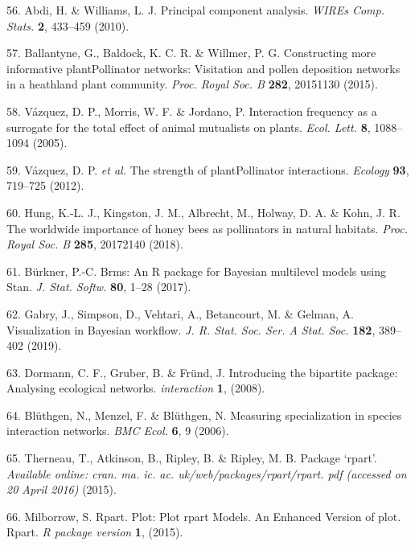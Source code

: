 \documentclass[
  12pt,
  a4paper,
]{article}
\begin{document}
\leavevmode\hypertarget{ref-abdi2010}{}%
56. Abdi, H. \& Williams, L. J. Principal component analysis. \emph{WIREs Comp. Stats.} \textbf{2}, 433--459 (2010).

\leavevmode\hypertarget{ref-ballantyne2015}{}%
57. Ballantyne, G., Baldock, K. C. R. \& Willmer, P. G. Constructing more informative plantPollinator networks: Visitation and pollen deposition networks in a heathland plant community. \emph{Proc. Royal Soc. B} \textbf{282}, 20151130 (2015).

\leavevmode\hypertarget{ref-vazquez2005}{}%
58. Vázquez, D. P., Morris, W. F. \& Jordano, P. Interaction frequency as a surrogate for the total effect of animal mutualists on plants. \emph{Ecol. Lett.} \textbf{8}, 1088--1094 (2005).

\leavevmode\hypertarget{ref-vazquez2012}{}%
59. Vázquez, D. P. \emph{et al.} The strength of plantPollinator interactions. \emph{Ecology} \textbf{93}, 719--725 (2012).

\leavevmode\hypertarget{ref-hung2018}{}%
60. Hung, K.-L. J., Kingston, J. M., Albrecht, M., Holway, D. A. \& Kohn, J. R. The worldwide importance of honey bees as pollinators in natural habitats. \emph{Proc. Royal Soc. B} \textbf{285}, 20172140 (2018).

\leavevmode\hypertarget{ref-burkner2017}{}%
61. Bürkner, P.-C. Brms: An R package for Bayesian multilevel models using Stan. \emph{J. Stat. Softw.} \textbf{80}, 1--28 (2017).

\leavevmode\hypertarget{ref-gabry2019}{}%
62. Gabry, J., Simpson, D., Vehtari, A., Betancourt, M. \& Gelman, A. Visualization in Bayesian workflow. \emph{J. R. Stat. Soc. Ser. A Stat. Soc.} \textbf{182}, 389--402 (2019).

\leavevmode\hypertarget{ref-dormann2008}{}%
63. Dormann, C. F., Gruber, B. \& Fründ, J. Introducing the bipartite package: Analysing ecological networks. \emph{interaction} \textbf{1}, (2008).

\leavevmode\hypertarget{ref-bluthgen2006}{}%
64. Blüthgen, N., Menzel, F. \& Blüthgen, N. Measuring specialization in species interaction networks. \emph{BMC Ecol.} \textbf{6}, 9 (2006).

\leavevmode\hypertarget{ref-therneau2015}{}%
65. Therneau, T., Atkinson, B., Ripley, B. \& Ripley, M. B. Package `rpart'. \emph{Available online: cran. ma. ic. ac. uk/web/packages/rpart/rpart. pdf (accessed on 20 April 2016)} (2015).

\leavevmode\hypertarget{ref-milborrow2015}{}%
66. Milborrow, S. Rpart. Plot: Plot rpart Models. An Enhanced Version of plot. Rpart. \emph{R package version} \textbf{1}, (2015).
\end{document}
